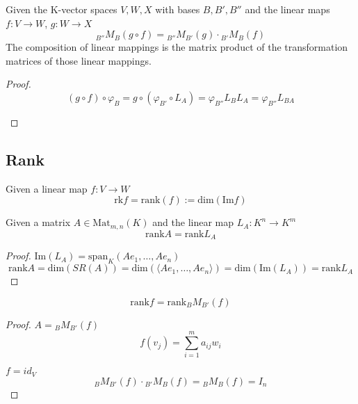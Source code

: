 \begin{theorem}
   Given the K-vector spaces \(V, W, X\) with bases \(B, B', B''\) and the linear maps \(f: V \to W\), \(g: W \to X\)
   \[{}_{B''}M_{B}(g \circ f) = {}_{B''}M_{B'}(g) \cdot {}_{B'}M_{B}(f)\]
   The composition of linear mappings is the matrix product of the transformation matrices of those linear mappings.
\end{theorem}
\begin{proof}
   \[(g \circ f) \circ \varphi_{B} = g \circ (\varphi_{B'} \circ L_{A}) = \varphi_{B''} L_{B} L_{A} = \varphi_{B''} L_{BA}\]

   \begin{center}
   \end{center}
\end{proof}

\subsection{Rank}
\begin{definition}\label{def:linmaprank}
   Given a linear map \(f: V \to W\)
   \[\text{rk}f = \text{rank}(f) := \text{dim}(\text{Im}f)\]
\end{definition}

\begin{theorem}
   Given a matrix \(A \in \text{Mat}_{m,n}(K)\) and the linear map \(L_{A}: K^n \to K^m\)
   \[\text{rank}A = \text{rank}L_{A}\]
\end{theorem}
\begin{proof}
   \(\text{Im}(L_{A}) = \text{span}_K(Ae_1, \ldots, Ae_n)\)
   \[\text{rank}A = \text{dim}(SR(A)) = \text{dim}(\langle Ae_1, \ldots, Ae_n \rangle) = \text{dim}(\text{Im}(L_{A})) = \text{rank}L_{A}\]
\end{proof}

\begin{corollary}
   \[\text{rank}f = \text{rank}{}_{B}M_{B'}(f)\]
\end{corollary}
\begin{proof}
   \(A = {}_{B}M_{B'}(f)\)
   \[f(v_j) = \sum_{i=1}^m a_{ij} w_i\]

   \(f = id_{V}\)
   \[{}_{B}M_{B'}(f) \cdot {}_{B'}M_{B}(f) = {}_{B}M_{B}(f) = I_n\]
\end{proof}

